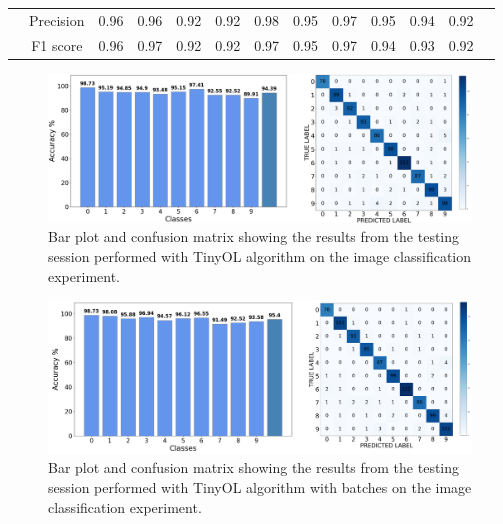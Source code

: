 \documentclass[12pt]{report}
\begin{document}
\begin{landscape}
\begin{table}[]
\begin{tabular}{cc|ccccccccllc}
                                                                                  & Precision                           & 0.96                            & 0.96                            & 0.92                            & 0.92                            & 0.98                            & 0.95                            & 0.97                            & 0.95                            & 0.94                            & 0.92                            &                                                                                   \\ \cline{2-2}
                                                                                  & F1 score                            & 0.96                            & 0.97                            & 0.92                            & 0.92                            & 0.97                            & 0.95                            & 0.97                            & 0.94                            & 0.93                            & 0.92                            &                                                                                  
\end{tabular}
\end{table}
\end{landscape}

\begin{figure}[h!]
    \centering
    \includegraphics[width=140mm]{Figures/Chapter5/OPENMV_OL.png} 

    \caption{Bar plot and confusion matrix showing the results from the testing session performed with TinyOL algorithm on the image classification experiment.}
    \label{fig:openmv_res_OL}    
\end{figure}

\begin{figure}[h!]
    \centering
    \includegraphics[width=140mm]{Figures/Chapter5/OPENMV_OL_BATCH.png} 
    \caption{Bar plot and confusion matrix showing the results from the testing session performed with TinyOL algorithm with batches on the image classification experiment.}
    \label{fig:openmv_res_OL_batch}    
\end{figure}
\end{document}
